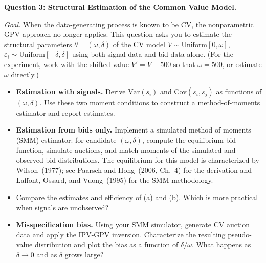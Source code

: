 \documentclass[11pt]{article}
\begin{document}
\noindent\textbf{Question 3: Structural Estimation of the Common Value Model.}

\smallskip

\noindent\textit{Goal.} When the data-generating process is known to be CV, the nonparametric GPV approach no longer applies. This question asks you to estimate the structural parameters $\theta = (\omega, \delta)$ of the CV model $V \sim \text{Uniform}[0, \omega]$, $\varepsilon_i \sim \text{Uniform}[-\delta, \delta]$ using both signal data and bid data alone. (For the experiment, work with the shifted value $V' = V - 500$ so that $\omega = 500$, or estimate $\omega$ directly.)

\begin{itemize}[leftmargin=*]

\item[(a)] \textbf{Estimation with signals.} Derive $\text{Var}(s_i)$ and $\text{Cov}(s_i, s_j)$ as functions of $(\omega, \delta)$. Use these two moment conditions to construct a method-of-moments estimator and report estimates.

\item[(b)] \textbf{Estimation from bids only.} Implement a simulated method of moments (SMM) estimator: for candidate $(\omega, \delta)$, compute the equilibrium bid function, simulate auctions, and match moments of the simulated and observed bid distributions. The equilibrium for this model is characterized by Wilson~(1977); see Paarsch and Hong~(2006, Ch.~4) for the derivation and Laffont, Ossard, and Vuong~(1995) for the SMM methodology.

\item[(c)] Compare the estimates and efficiency of (a) and (b). Which is more practical when signals are unobserved?

\item[(d)] \textbf{Misspecification bias.} Using your SMM simulator, generate CV auction data and apply the IPV-GPV inversion. Characterize the resulting pseudo-value distribution and plot the bias as a function of $\delta/\omega$. What happens as $\delta \to 0$ and as $\delta$ grows large?

\end{itemize}



\end{document}
